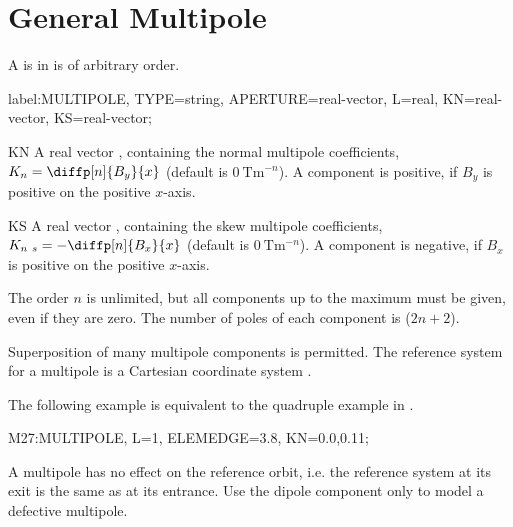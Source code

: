 \clearpage
\section{General Multipole}
\label{sec:multipole}
A  is in \opalt is of arbitrary order.
\begin{example}
label:MULTIPOLE, TYPE=string, APERTURE=real-vector,
      L=real, KN=real-vector, KS=real-vector;
\end{example}
\begin{kdescription}
\item[KN]
  A real vector ,
  containing the normal multipole coefficients,
  $K_n=\diffp[n]{B_y}{x}$
  (default is $\SI{0}{\tesla\meter\tothe{-n}}$).
  A component is positive, if $B_y$ is positive on the positive $x$-axis.
\item[KS]
  A real vector ,
  containing the skew multipole coefficients,
  $K_{n~s}=-\diffp[n]{B_x}{x}$
  (default is $\SI{0}{\tesla\meter\tothe{-n}}$).
  A component is negative, if $B_x$ is positive on the positive $x$-axis.
\end{kdescription}
The order $n$ is unlimited, but all components up to the maximum must be given, even if they are zero.
The number of poles of each component is ($2 n + 2$).

Superposition of many multipole components is permitted.
The reference system for a multipole is a Cartesian coordinate system
.

\noindent The following example is equivalent to the quadruple example in .
\begin{example}
M27:MULTIPOLE, L=1, ELEMEDGE=3.8, KN={0.0,0.11};
\end{example}
A multipole has no effect on the reference orbit, i.e. the reference system at its exit is the same as at its entrance. Use the dipole component only to model a defective multipole.

\clearpage
